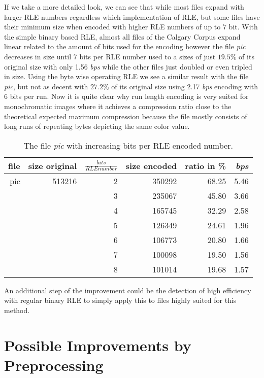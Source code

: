 \par{
If we take a more detailed look, we can see that while most files expand with larger RLE numbers regardless which implementation of RLE, but some files have their minimum size when encoded with higher RLE numbers of up to 7 bit. With the simple binary based RLE, almost all files of the Calgary Corpus expand linear related to the amount of bits used for the encoding however the file \textit{pic} decreases in size until 7 bits per RLE number used to a sizes of just $19.5 \%$ of its original size with only  1.56 \textit{bps} while the other files just doubled or even tripled in size. Using the byte wise operating RLE we see a similar result with the file \textit{pic}, but not as decent with $27.2\%$ of its original size using 2.17 \textit{bps} encoding with 6 bits per run. Now it is quite clear why run length encoding is very suited for monochromatic images where it achieves a compression ratio close to the theoretical expected maximum compression because the file mostly consists of long runs of repeating bytes depicting the same color value.

\begin{table}[H]
	\centering
	\begin{tabular}{r|r|r|r|r|r}	
		file & size original & $\frac{bits}{RLE number}$ & size encoded & ratio in \% & \textit{bps}\\
		\hline
		pic & 513216 & 2 & 350292 & 68.25 & 5.46 \\
		 & & 3 & 235067 & 45.80 & 3.66\\
		 & & 4 & 165745 & 32.29 & 2.58\\
		 & & 5 & 126349 & 24.61 & 1.96\\
		 & & 6 & 106773 & 20.80 & 1.66\\
		 & & 7 & 100098 & 19.50 & 1.56\\
		 & & 8 & 101014 & 19.68 & 1.57\\		 
	\end{tabular}
	\caption{The file \textit{pic} with increasing bits per RLE encoded number.}
	\label{tab:t40 The file pic with increasing bits per RLE encoded number}
\end{table}	
}

\par{
An additional step of the improvement could be the detection of high efficiency with regular binary RLE to simply apply this to files highly suited for this method.
}

\section{Possible Improvements by Preprocessing}
\label{ch:Analysis:sec:Improvements by Preprocessing}

